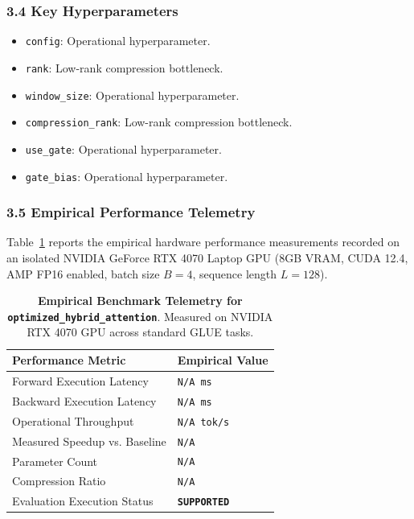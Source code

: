 \subsubsection*{3.4 Key Hyperparameters}
\begin{itemize}
    \item \texttt{config}: Operational hyperparameter.
    \item \texttt{rank}: Low-rank compression bottleneck.
    \item \texttt{window\_size}: Operational hyperparameter.
    \item \texttt{compression\_rank}: Low-rank compression bottleneck.
    \item \texttt{use\_gate}: Operational hyperparameter.
    \item \texttt{gate\_bias}: Operational hyperparameter.
\end{itemize}

\subsubsection*{3.5 Empirical Performance Telemetry}
Table~\ref{tab:telemetry_optimized\_hybrid\_attention} reports the empirical hardware performance measurements recorded on an isolated NVIDIA GeForce RTX 4070 Laptop GPU (8GB VRAM, CUDA 12.4, AMP FP16 enabled, batch size $B=4$, sequence length $L=128$).

\begin{table}[h]
\centering
\small
\caption{\textbf{Empirical Benchmark Telemetry for \texttt{optimized\_hybrid\_attention}}. Measured on NVIDIA RTX 4070 GPU across standard GLUE tasks.}
\label{tab:telemetry_optimized\_hybrid\_attention}
\begin{tabularx}{\columnwidth}{lX}
\toprule
\textbf{Performance Metric} & \textbf{Empirical Value} \\
\midrule
Forward Execution Latency & \texttt{N/A ms} \\
Backward Execution Latency & \texttt{N/A ms} \\
Operational Throughput & \texttt{N/A tok/s} \\
Measured Speedup vs. Baseline & \texttt{N/A} \\
Parameter Count & \texttt{N/A} \\
Compression Ratio & \texttt{N/A} \\
Evaluation Execution Status & \textbf{\texttt{SUPPORTED}} \\
\bottomrule
\end{tabularx}
\end{table}

